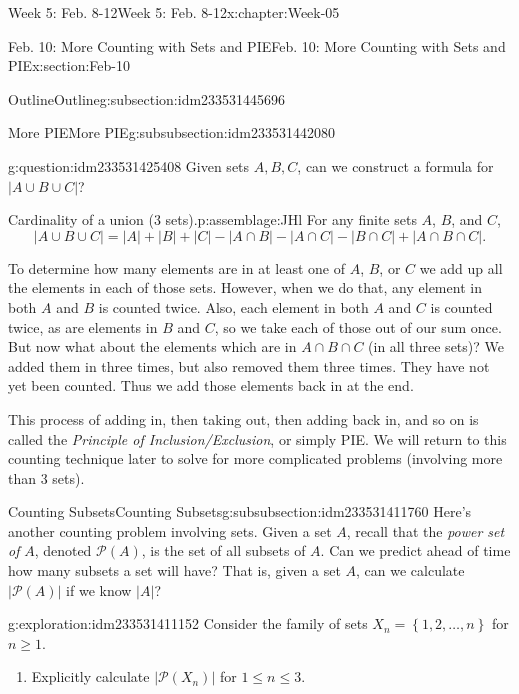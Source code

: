 \documentclass[oneside,10pt,]{book}
\numberwithin{equation}{section}
\renewcommand{\le}{\leqslant}
\renewcommand{\ge}{\geqslant}
\newcommand{\set}[1]{\left\{ {#1} \right\}}
\def\pow{{\mathcal P}}
\newcommand{\pow}{\mathcal P}
\newcommand{\card}[1]{\left| #1 \right|}
\begin{document}
\begin{chapterptx}{Week 5: Feb. 8-12}{}{Week 5: Feb. 8-12}{}{}{x:chapter:Week-05}
\begin{sectionptx}{Feb. 10: More Counting with Sets and PIE}{}{Feb. 10: More Counting with Sets and PIE}{}{}{x:section:Feb-10}
\begin{subsectionptx}{Outline}{}{Outline}{}{}{g:subsection:idm233531445696}
\begin{subsubsectionptx}{More PIE}{}{More PIE}{}{}{g:subsubsection:idm233531442080}
\begin{question}{}{g:question:idm233531425408}%
Given sets \(A, B, C\), can we construct a formula for \(\card{A\cup B\cup C}\)?%
\end{question}
\begin{assemblage}{Cardinality of a union (3 sets).}{p:assemblage:JHl}%
For any finite sets \(A\), \(B\), and \(C\),%
\begin{equation*}
\card{A \cup B \cup C} = \card{A} + \card{B} + \card{C} - \card{A \cap B} - \card{A \cap C} - \card{B \cap C} + \card{A \cap B \cap C}\text{.}
\end{equation*}
%
\end{assemblage}
To determine how many elements are in at least one of \(A\), \(B\), or \(C\) we add up all the elements in each of those sets. However, when we do that, any element in both \(A\) and \(B\) is counted twice. Also, each element in both \(A\) and \(C\) is counted twice, as are elements in \(B\) and \(C\), so we take each of those out of our sum once. But now what about the elements which are in \(A \cap B \cap C\) (in all three sets)? We added them in three times, but also removed them three times. They have not yet been counted. Thus we add those elements back in at the end.%
\par
This process of adding in, then taking out, then adding back in, and so on is called the \emph{Principle of Inclusion\slash{}Exclusion}, or simply PIE. We will return to this counting technique later to solve for more complicated problems (involving more than 3 sets).%
\end{subsubsectionptx}
%
%
\typeout{************************************************}
\typeout{************************************************}
%
\begin{subsubsectionptx}{Counting Subsets}{}{Counting Subsets}{}{}{g:subsubsection:idm233531411760}
Here's another counting problem involving sets. Given a set \(A\), recall that the \emph{power set of} \(A\), denoted \(\pow(A)\), is the set of all subsets of \(A\). Can we predict ahead of time how many subsets a set will have? That is, given a set \(A\), can we calculate \(\card{\pow(A)}\) if we know \(\card{A}\)?%
\begin{exploration}{}{g:exploration:idm233531411152}%
Consider the family of sets \(X_n = \set{1,2,\ldots,n}\) for \(n\ge 1\).%
%
\begin{enumerate}
\item{}Explicitly calculate \(\card{\pow(X_n)}\) for \(1 \le n \le 3\).%

\end{enumerate}
\end{exploration}
\end{subsubsectionptx}
\end{subsectionptx}
\end{sectionptx}
\end{chapterptx}
\end{document}
